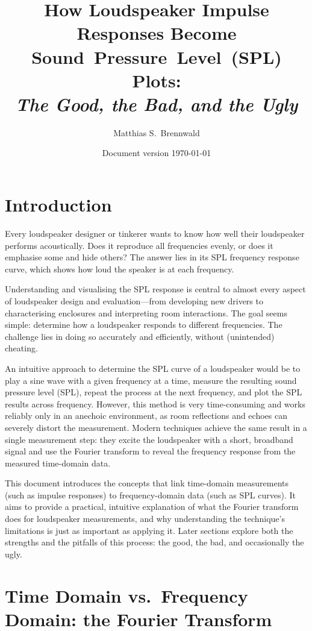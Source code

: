 \documentclass[12pt,a4paper]{article}
\title{How Loudspeaker Impulse Responses Become Sound~Pressure~Level~(SPL) Plots:\\[0.7em]\textit{The Good, the Bad, and the Ugly}}
\author{Matthias S.~Brennwald}
\date{Document version \today}
\providecommand{\seclabel}[1]{\label{sec:#1}}
\begin{document}
\maketitle

\section{Introduction}

Every loudspeaker designer or tinkerer wants to know how well their loudspeaker performs acoustically. Does it reproduce all frequencies evenly, or does it emphasise some and hide others? The answer lies in its SPL frequency response curve, which shows how loud the speaker is at each frequency.

Understanding and visualising the SPL response is central to almost every aspect of loudspeaker design and evaluation—from developing new drivers to characterising enclosures and interpreting room interactions. The goal seems simple: determine how a loudspeaker responds to different frequencies. The challenge lies in doing so accurately and efficiently, without (unintended) cheating.

An intuitive approach to determine the SPL curve of a loudspeaker would be to play a sine wave with a given frequency at a time, measure the resulting sound pressure level (SPL), repeat the process at the next frequency, and plot the SPL results across frequency. However, this method is very time-consuming and works reliably only in an anechoic environment, as room reflections and echoes can severely distort the measurement. Modern techniques achieve the same result in a single measurement step: they excite the loudspeaker with a short, broadband signal and use the Fourier transform to reveal the frequency response from the measured time-domain data.

This document introduces the concepts that link time-domain measurements (such as impulse responses) to frequency-domain data (such as SPL curves). It aims to provide a practical, intuitive explanation of what the Fourier transform does for loudspeaker measurements, and why understanding the technique's limitations is just as important as applying it. Later sections explore both the strengths and the pitfalls of this process: the good, the bad, and occasionally the ugly.


\section{Time Domain vs.\ Frequency Domain: the Fourier Transform}\seclabel{Fourier_Theory}
\end{document}
